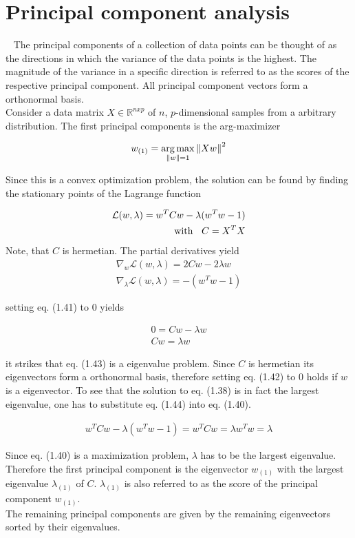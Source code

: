 \section{Principal component analysis}~\label{sec:pca}
The principal components of a collection of data points can be thought of as the directions in which the variance of the data points is the highest. The magnitude of the variance in a specific direction is referred to as the scores of the respective principal component. All principal component vectors form a orthonormal basis.\\
Consider a data matrix $X \in \mathbb{R}^{nxp}$ of $n$, $p$-dimensional samples from a arbitrary distribution. The first principal components is the arg-maximizer

\begin{align}
	w_{(1)} = \operatorname*{arg\,max}_{\left\lVert w\right\rVert = 1} \left\lVert Xw\right\rVert^2
\end{align}

Since this is a convex optimization problem, the solution can be found by finding the stationary points of the Lagrange function

\begin{align}
	\mathcal{L}(w, \lambda) = w^TCw - \lambda(w^Tw -1) \\
	\text{with \hspace{2mm}} C = X^TX
\end{align}
Note, that $C$ is hermetian.
The partial derivatives yield	
\begin{align}
	\nabla_w \mathcal{L}(w, \lambda) = 2Cw-2\lambda w \\
	\nabla_\lambda \mathcal{L}(w, \lambda) = - (w^Tw -1)
\end{align}

setting eq. (1.41) to $0$ yields

\begin{align}
	0 = Cw-\lambda w \\
	Cw = \lambda w
\end{align}

it strikes that eq. (1.43) is a eigenvalue problem. Since $C$ is hermetian its eigenvectors form a orthonormal basis, therefore setting eq. (1.42) to $0$ holds if $w$ is a eigenvector. To see that the solution to eq. (1.38) is in fact the largest eigenvalue, one has to substitute eq. (1.44) into eq. (1.40).

\begin{align}
	w^TCw - \lambda(w^Tw -1) = w^TCw = \lambda w^Tw = \lambda
\end{align}

Since eq. (1.40) is a maximization problem, $\lambda$ has to be the largest eigenvalue.
Therefore the first principal component is the eigenvector $w_{(1)}$ with the largest eigenvalue $\lambda_{(1)}$ of $C$. $\lambda_{(1)}$ is also referred to as the score of the principal component $w_{(1)}$. \\

The remaining principal components are given by the remaining eigenvectors sorted by their eigenvalues.
